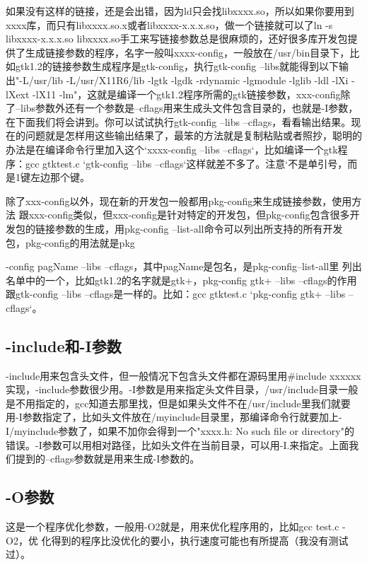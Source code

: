 如果没有这样的链接，还是会出错，因为ld只会找libxxxx.so，所以如果你要用到xxxx库，而只有libxxxx.so.x或者libxxxx-x.x.x.so，做一个链接就可以了ln -s libxxxx-x.x.x.so libxxxx.so手工来写链接参数总是很麻烦的，还好很多库开发包提供了生成链接参数的程序，名字一般叫xxxx-config，一般放在/usr/bin目录下，比如gtk1.2的链接参数生成程序是gtk-config，执行gtk-config --libs就能得到以下输出"-L/usr/lib -L/usr/X11R6/lib -lgtk -lgdk -rdynamic -lgmodule -lglib -ldl -lXi -lXext -lX11 -lm"，这就是编译一个gtk1.2程序所需的gtk链接参数，xxx-config除了--libs参数外还有一个参数是--cflags用来生成头文件包含目录的，也就是-I参数，在下面我们将会讲到。你可以试试执行gtk-config --libs --cflags，看看输出结果。现在的问题就是怎样用这些输出结果了，最笨的方法就是复制粘贴或者照抄，聪明的办法是在编译命令行里加入这个`xxxx-config --libs --cflags`，比如编译一个gtk程序：gcc gtktest.c `gtk-config --libs --cflags`这样就差不多了。注意`不是单引号，而是1键左边那个键。

除了xxx-config以外，现在新的开发包一般都用pkg-config来生成链接参数，使用方法
跟xxx-config类似，但xxx-config是针对特定的开发包，但pkg-config包含很多开发包的链接参数的生成，用pkg-config --list-all命令可以列出所支持的所有开发包，pkg-config的用法就是pkg

-config pagName --libs --cflags，其中pagName是包名，是pkg-config--list-all里
列出名单中的一个，比如gtk1.2的名字就是gtk+，pkg-config gtk+ --libs --cflags的作用跟gtk-config --libs --cflags是一样的。比如：gcc gtktest.c `pkg-config gtk+ --libs --cflags`。


\subsection{-include和-I参数}
-include用来包含头文件，但一般情况下包含头文件都在源码里用\#include xxxxxx实现，-include参数很少用。-I参数是用来指定头文件目录，/usr/include目录一般是不用指定的，gcc知道去那里找，但是如果头文件不在/usr/include里我们就要用-I参数指定了，比如头文件放在/myinclude目录里，那编译命令行就要加上-I/myinclude参数了，如果不加你会得到一个"xxxx.h: No such file or directory"的错误。-I参数可以用相对路径，比如头文件在当前目录，可以用-I.来指定。上面我们提到的--cflags参数就是用来生成-I参数的。


\subsection{-O参数}
这是一个程序优化参数，一般用-O2就是，用来优化程序用的，比如gcc test.c -O2，优
化得到的程序比没优化的要小，执行速度可能也有所提高（我没有测试过）。



